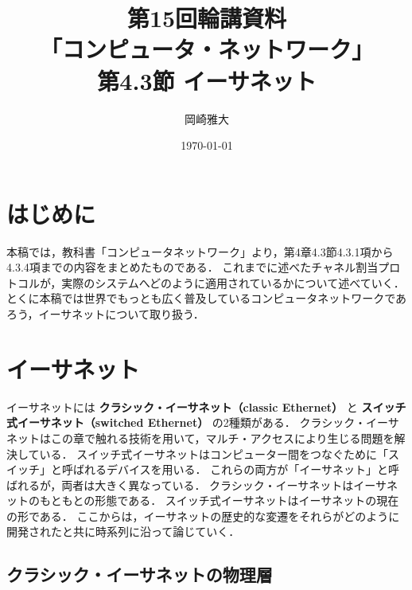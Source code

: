 \documentclass[a4paper]{ltjsarticle}
\title{第15回輪講資料\\ 「コンピュータ・ネットワーク」\\第4.3節 イーサネット}
\date{\today}
\author{岡崎雅大}
\begin{document}
\maketitle
\tableofcontents

\section{はじめに}\label{ux306fux3058ux3081ux306b}

本稿では，教科書「コンピュータネットワーク」より，第4章4.3節4.3.1項から4.3.4項までの内容をまとめたものである．
これまでに述べたチャネル割当プロトコルが，実際のシステムへどのように適用されているかについて述べていく．
とくに本稿では世界でもっとも広く普及しているコンピュータネットワークであろう，イーサネットについて取り扱う．

\section{イーサネット}\label{ux30a4ux30fcux30b5ux30cdux30c3ux30c8}

イーサネットには \textbf{クラシック・イーサネット（classic Ethernet）}
と \textbf{スイッチ式イーサネット（switched Ethernet）} の2種類がある．
クラシック・イーサネットはこの章で触れる技術を用いて，マルチ・アクセスにより生じる問題を解決している．
スイッチ式イーサネットはコンピューター間をつなぐために「スイッチ」と呼ばれるデバイスを用いる．
これらの両方が「イーサネット」と呼ばれるが，両者は大きく異なっている．
クラシック・イーサネットはイーサネットのもともとの形態である．
スイッチ式イーサネットはイーサネットの現在の形である．
ここからは，イーサネットの歴史的な変遷をそれらがどのように開発されたと共に時系列に沿って論じていく．

\subsection{クラシック・イーサネットの物理層}\label{ux30afux30e9ux30b7ux30c3ux30afux30a4ux30fcux30b5ux30cdux30c3ux30c8ux306eux7269ux7406ux5c64}
\end{document}
